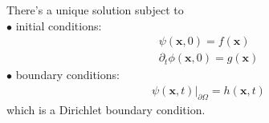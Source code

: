 \documentclass[a4paper]{article}
\begin{document}
There's a unique solution subject to \\
$\bullet$ initial conditions:
\begin{equation*}
\begin{aligned}
\psi\left(\mathbf{x},0\right) = f\left(\mathbf{x}\right)\\
\partial_t \phi\left(\mathbf{x},0\right) = g\left(\mathbf{x}\right)
\end{aligned}
\end{equation*}
$\bullet$ boundary conditions:
\begin{equation*}
\begin{aligned}
\psi\left(\mathbf{x},t\right)|_{\partial \Omega} = h\left(\mathbf{x},t\right)
\end{aligned}
\end{equation*}
which is a Dirichlet boundary condition.
\end{document}
